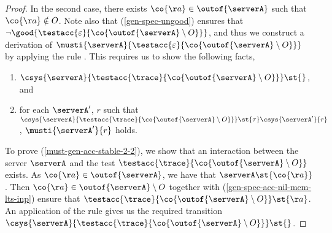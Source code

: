 {\begin{proof}
In the second case, there exists $\co{\aa} \in \outof{\serverA}$ such that
$\co{\aa} \notin O$.
Note also that
(\ref{gen-spec-ungood})
ensures that  $\lnot \good{\testacc{\varepsilon}{\co{ \outof{\serverA} \setminus O}}}$,
and thus we construct a derivation of
$\musti{ \serverA }{\testacc{\varepsilon}{\co{ \outof{\serverA} \setminus O}}}$
by applying the rule \mstep. This requires us to show the following facts,
\begin{enumerate}
\item\label{must-gen-acc-stable-2-2} $\csys{\serverA}{\testacc{\trace}{\co{ \outof{\serverA} \setminus O}}} \st{}$, and
\item\label{must-gen-acc-stable-2-3} for each $\serverA'$, $r$ such that
  $\csys{\serverA}{\testacc{\trace}{\co{ \outof{\serverA} \setminus O}} } \st{\tau} \csys{\serverA'}{r}$,
  $\musti{\serverA'}{r}$ holds.
\end{enumerate}


To prove (\ref{must-gen-acc-stable-2-2}), we show that an interaction between
the server $\serverA$ and the test $\testacc{\trace}{\co{ \outof{\serverA} \setminus O }}$ exists.
As $\co{\aa} \in \outof{\serverA}$, we have that $\serverA \st{\co{\aa}}$.
Then $\co{\aa} \in \outof{\serverA} \setminus O$
together with (\ref{gen-spec-acc-nil-mem-lts-inp}) ensure
that $\testacc{\trace}{\co{ \outof{\serverA} \setminus O }} \st{\aa}$.
An application of the rule  gives us the required transition
$\csys{\serverA}{\testacc{\trace}{\co{ \outof{\serverA} \setminus O}}} \st{}$.



\end{proof}}
